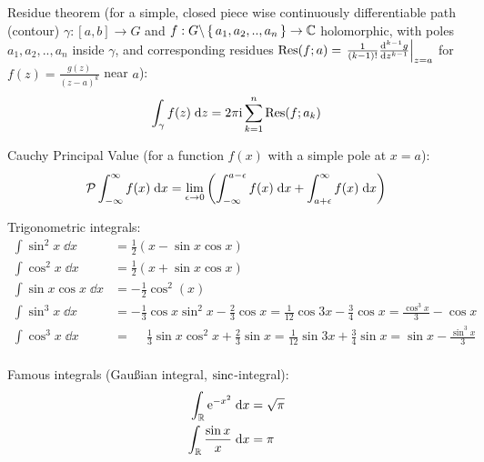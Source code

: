 			\noindent
			Residue theorem (for a simple, closed piece wise continuously differentiable path (contour) $\gamma:\left[a,b\right]\rightarrow G$ and $f:G\backslash\set{a_1, a_2, .., a_n} \rightarrow \mathbb{C}$ holomorphic,
			with poles $a_1, a_2, .., a_n$ inside $\gamma$, and corresponding residues $\mathrm{Res}(f; a) = \eval{\frac{1}{(k-1)!}\dv[k-1]{g}{z}}_{z=a}$ for $f(z)=\frac{g(z)}{(z-a)^k}$ near $a$):
			\begin{equation}
				\int_\gamma f(z)\;\dd z = 2\pi \mathrm{i} \sum_{k=1}^{n} \mathrm{Res}(f; a_k)
			\end{equation}

			\noindent
			Cauchy Principal Value (for a function $f(x)$ with a simple pole at $x=a$):
			\begin{equation}
				\mathcal{P}\int_{-\infty}^{\infty} f(x)\;\dd x = \lim_{\epsilon\rightarrow 0} \qty(\int_{-\infty}^{a-\epsilon} f(x)\;\dd x + \int_{a+\epsilon}^{\infty} f(x)\;\dd x)
			\end{equation}

			\noindent
			Trigonometric integrals: 
			\begin{equation}
				\begin{split}
					\int \sin^2 x\;\dd x &= \frac{1}{2}( x-\sin  x\cos  x) \\
					\int \cos^2 x\;\dd x &= \frac{1}{2}( x+\sin  x\cos  x) \\
					\int{\sin x\cos x\;\dd x} &= -\frac{1}{2}\cos^2( x) \\
					\int \sin^3 x\;\dd x 
					&= -\frac{1}{3}\cos{ x}\sin^2{ x}-\frac{2}{3}\cos{ x}
					= \frac{1}{12}\cos{3 x}-\frac{3}{4}\cos{ x} 
					= \frac{\cos ^3 x}{3}-\cos x\\
					\int \cos^3 x\;\dd x 
					&= \phantom{-}\frac{1}{3}\sin x \cos^2 x+\frac{2}{3}\sin  x
					= \frac{1}{12}\sin{3 x}+\frac{3}{4}\sin{ x} 
					= \sin x-\frac{\sin^3x}{3} \\
				\end{split}
			\end{equation}

			\noindent
			Famous integrals (Gaußian integral, $\mathrm{sinc}$-integral):
			\begin{equation}
				\begin{aligned}
					\int_\mathbb{R} \mathrm{e}^{-x^2}\;\dd x &= \sqrt{\pi} \\
					\int_\mathbb{R} \frac{\sin x}{x}\;\dd x &= \pi \\
				\end{aligned}
			\end{equation}

